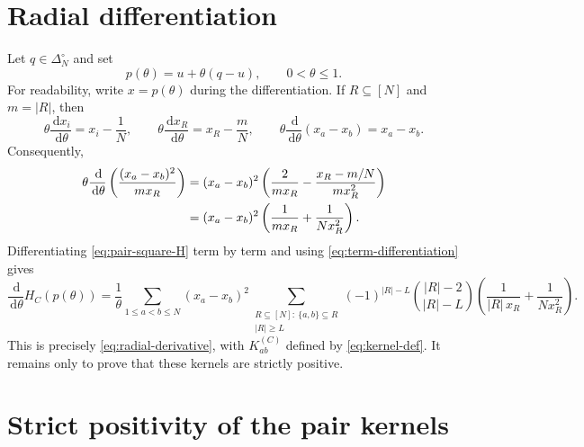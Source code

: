 \documentclass[11pt]{article}
\theoremstyle{remark}
\newcommand{\dd}{\,\mathrm{d}}
\newcommand{\card}[1]{\lvert #1\rvert}
\begin{document}
\section{Radial differentiation}

Let $q\in\Delta_N^\circ$ and set
\[
        p(\theta)=u+\theta(q-u),\qquad 0<\theta\le1.
\]
For readability, write $x=p(\theta)$ during the differentiation.  If
$R\subseteq[N]$ and $m=\card R$, then
\begin{equation}\label{eq:radial-basic-derivatives}
        \theta\frac{\dd x_i}{\dd\theta}=x_i-\frac1N,
        \qquad
        \theta\frac{\dd x_R}{\dd\theta}=x_R-\frac{m}{N},
        \qquad
        \theta\frac{\dd}{\dd\theta}(x_a-x_b)=x_a-x_b.
\end{equation}
Consequently,
\begin{align}
        \theta\frac{\dd}{\dd\theta}
        \left(\frac{(x_a-x_b)^2}{m x_R}\right)
        &=(x_a-x_b)^2
        \left(
            \frac{2}{m x_R}
            -
            \frac{x_R-m/N}{m x_R^2}
        \right) \notag\\
        &=(x_a-x_b)^2
        \left(
            \frac{1}{m x_R}
            +
            \frac{1}{N x_R^2}
        \right).
        \label{eq:term-differentiation}
\end{align}
Differentiating \eqref{eq:pair-square-H} term by term and using
\eqref{eq:term-differentiation} gives
\[
        \frac{\dd}{\dd\theta}H_C(p(\theta))
        =
        \frac{1}{\theta}
        \sum_{1\le a<b\le N}
        (x_a-x_b)^2
        \sum_{\substack{R\subseteq[N]:\ \{a,b\}\subseteq R\\ \card R\ge L}}
        (-1)^{\card R-L}
        \binom{\card R-2}{\card R-L}
        \left(
            \frac{1}{\card R\,x_R}
            +
            \frac{1}{N x_R^2}
        \right).
\]
This is precisely \eqref{eq:radial-derivative}, with $K_{ab}^{(C)}$
defined by \eqref{eq:kernel-def}.  It remains only to prove that these
kernels are strictly positive.

\section{Strict positivity of the pair kernels}
\end{document}

